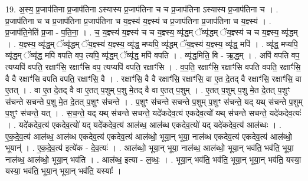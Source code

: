 \documentclass[17pt]{extarticle}
\begin{document}
19. अ॒स्य॒ प्र॒जाप॑तिना प्र॒जाप॑तिना ऽस्यास्य प्र॒जाप॑तिना च च प्र॒जाप॑तिना ऽस्यास्य प्र॒जाप॑तिना च । . प्र॒जाप॑तिना च च प्र॒जाप॑तिना प्र॒जाप॑तिना च य॒ज्ञ्स्य॑ य॒ज्ञ्स्य॑ च प्र॒जाप॑तिना प्र॒जाप॑तिना च य॒ज्ञ्स्य॑ । . प्र॒जाप॑ति॒नेति॑ प्र॒जा - प॒ति॒ना॒ । . च॒ य॒ज्ञ्स्य॑ य॒ज्ञ्स्य॑ च च य॒ज्ञ्स्य॒ व्यृ॑द्ध॒म् ॅव्यृ॑द्धम् ॅय॒ज्ञ्स्य॑ च च य॒ज्ञ्स्य॒ व्यृ॑द्धम् । . य॒ज्ञ्स्य॒ व्यृ॑द्ध॒म् ॅव्यृ॑द्धम् ॅय॒ज्ञ्स्य॑ य॒ज्ञ्स्य॒ व्यृ॑द्ध॒ मप्यपि॒ व्यृ॑द्धम् ॅय॒ज्ञ्स्य॑ य॒ज्ञ्स्य॒ व्यृ॑द्ध॒ मपि॑ । . व्यृ॑द्ध॒ मप्यपि॒ व्यृ॑द्ध॒म् ॅव्यृ॑द्ध॒ मपि॑ वपति वप॒ त्यपि॒ व्यृ॑द्ध॒म् ॅव्यृ॑द्ध॒ मपि॑ वपति । . व्यृ॑द्ध॒मिति॒ वि - ऋ॒द्ध॒म् । . अपि॑ वपति वप॒ त्यप्यपि॑ वपति॒ रक्षाꣳ॑सि॒ रक्षाꣳ॑सि वप॒ त्यप्यपि॑ वपति॒ रक्षाꣳ॑सि । . व॒प॒ति॒ रक्षाꣳ॑सि॒ रक्षाꣳ॑सि वपति वपति॒ रक्षाꣳ॑सि॒ वै वै रक्षाꣳ॑सि वपति वपति॒ रक्षाꣳ॑सि॒ वै । . रक्षाꣳ॑सि॒ वै वै रक्षाꣳ॑सि॒ रक्षाꣳ॑सि॒ वा ए॒त दे॒तद् वै रक्षाꣳ॑सि॒ रक्षाꣳ॑सि॒ वा ए॒तत् । . वा ए॒त दे॒तद् वै वा ए॒तत् प॒शुम् प॒शु मे॒तद् वै वा ए॒तत् प॒शुम् । . ए॒तत् प॒शुम् प॒शु मे॒त दे॒तत् प॒शुꣳ स॑चन्ते सचन्ते प॒शु मे॒त दे॒तत् प॒शुꣳ स॑चन्ते । . प॒शुꣳ स॑चन्ते सचन्ते प॒शुम् प॒शुꣳ स॑चन्ते॒ यद् यथ् स॑चन्ते प॒शुम् प॒शुꣳ स॑चन्ते॒ यत् । . स॒च॒न्ते॒ यद् यथ् स॑चन्ते सचन्ते॒ यदे॑कदेव॒त्य॑ एकदेव॒त्यो॑ यथ् स॑चन्ते सचन्ते॒ यदे॑कदेव॒त्यः॑ । . यदे॑कदेव॒त्य॑ एकदेव॒त्यो॑ यद् यदे॑कदेव॒त्य॑ आल॑ब्ध॒ आल॑ब्ध एकदेव॒त्यो॑ यद् यदे॑कदेव॒त्य॑ आल॑ब्धः । . ए॒क॒दे॒व॒त्य॑ आल॑ब्ध॒ आल॑ब्ध एकदेव॒त्य॑ एकदेव॒त्य॑ आल॑ब्धो॒ भूया॒न् भूया॒ नाल॑ब्ध एकदेव॒त्य॑ एकदेव॒त्य॑ आल॑ब्धो॒ भूयान्॑ । . ए॒क॒दे॒व॒त्य॑ इत्ये॑क - दे॒व॒त्यः॑ । . आल॑ब्धो॒ भूया॒न् भूया॒ नाल॑ब्ध॒ आल॑ब्धो॒ भूया॒न् भव॑ति॒ भव॑ति॒ भूया॒ नाल॑ब्ध॒ आल॑ब्धो॒ भूया॒न् भव॑ति । . आल॑ब्ध॒ इत्या - ल॒ब्धः॒ । . भूया॒न् भव॑ति॒ भव॑ति॒ भूया॒न् भूया॒न् भव॑ति॒ यस्या॒ यस्या॒ भव॑ति॒ भूया॒न् भूया॒न् भव॑ति॒ यस्याः᳚ । \newline
\end{document}
